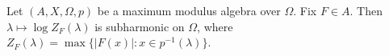 
Let $(A, X, \Omega, p)$ be a maximum modulus algebra over $\Omega$. Fix $F \in A$. Then $\lambda \mapsto \log Z_F(\lambda)$ is subharmonic on $\Omega$, where $Z_F(\lambda) = \max\{|F(x)| : x \in p^{-1}(\lambda)\}$.
